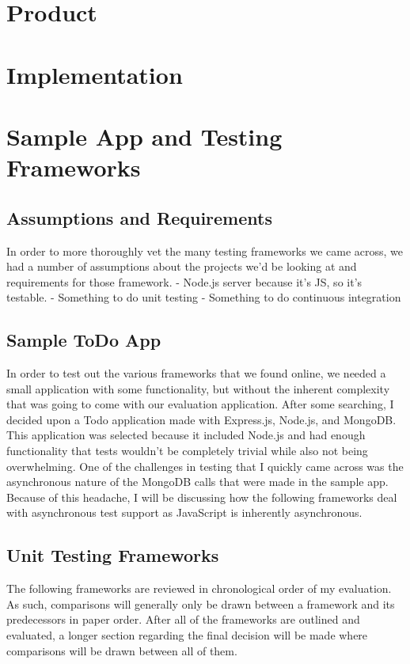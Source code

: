 \documentclass[11pt]{article}
\begin{document}
\section{Product}


\section{Implementation}


\section{Sample App and Testing Frameworks}

\subsection{Assumptions and Requirements}
In order to more thoroughly vet the many testing frameworks we came across, we had a number of assumptions about the projects we'd be looking at and requirements for those framework.
- Node.js server because it's JS, so it's testable.
- Something to do unit testing
- Something to do continuous integration

\subsection{Sample ToDo App}
In order to test out the various frameworks that we found online, we needed a small application with some functionality, but without the inherent complexity that was going to come with our evaluation application. After some searching, I decided upon a Todo application made with Express.js, Node.js, and MongoDB. \cite{ToDoAppHomePage} This application was selected because it included Node.js and had enough functionality that tests wouldn't be completely trivial while also not being overwhelming.
One of the challenges in testing that I quickly came across was the asynchronous nature of the MongoDB calls that were made in the sample app. Because of this headache, I will be discussing how the following frameworks deal with asynchronous test support as JavaScript is inherently asynchronous.

\subsection{Unit Testing Frameworks}
The following frameworks are reviewed in chronological order of my evaluation. As such, comparisons will generally only be drawn between a framework and its predecessors in paper order. After all of the frameworks are outlined and evaluated, a longer section regarding the final decision will be made where comparisons will be drawn between all of them. 
\end{document}
